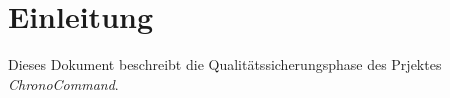 \section{Einleitung}

Dieses Dokument beschreibt die Qualitätssicherungsphase des Prjektes \emph{ChronoCommand}.